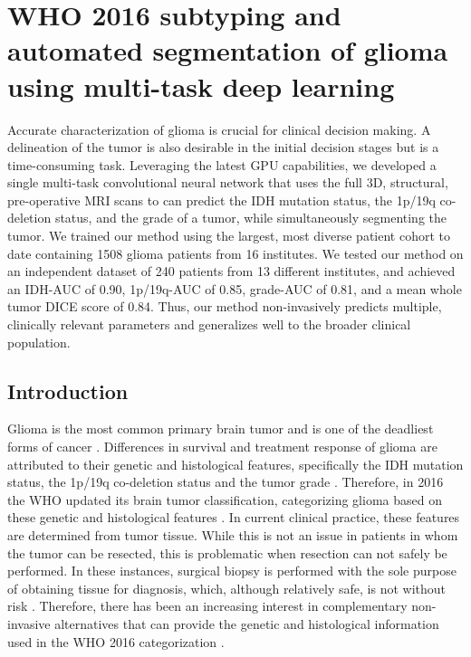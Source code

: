 \chapter[WHO 2016 subtyping and automated segmentation of glioma using multi-task deep learning][WHO 2016 subtyping]{WHO 2016 subtyping and automated segmentation of glioma using multi-task deep learning}\label{chap:prognosais}

\begin{ChapterAbstract}
    Accurate characterization of glioma is crucial for clinical decision making.
    A delineation of the tumor is also desirable in the initial decision stages but is a time-consuming task.
    Leveraging the latest GPU capabilities, we developed a single multi-task convolutional neural network that uses the full 3D, structural, pre-operative MRI scans to can predict the IDH mutation status, the 1p/19q co-deletion status, and the grade of a tumor, while simultaneously segmenting the tumor.
    We trained our method using the largest, most diverse patient cohort to date containing 1508 glioma patients from 16 institutes.
    We tested our method on an independent dataset of 240  patients from 13 different institutes, and achieved an IDH-AUC of 0.90, 1p/19q-AUC of 0.85, grade-AUC of 0.81, and a mean whole tumor DICE score of 0.84.
    Thus, our method non-invasively predicts multiple, clinically relevant parameters and generalizes well to the broader clinical population.
\end{ChapterAbstract}

\setcellgapes{5pt}

\section{Introduction}
Glioma is the most common primary brain tumor and is one of the deadliest forms of cancer \autocite{office2019cancer}.
Differences in survival and treatment response of glioma are attributed to their genetic and histological features, specifically the \gls{IDH} mutation status, the 1p/19q co-deletion status and the tumor grade \autocite{dubbink2015molecular, eckel2015gliomagroups}.
Therefore, in 2016 the \gls{WHO} updated its brain tumor classification, categorizing glioma based on these genetic and histological features \autocite{louis20162016}.
In current clinical practice, these features are determined from tumor tissue.
While this is not an issue in patients in whom the tumor can be resected, this is problematic when resection can not safely be performed.
In these instances,  surgical biopsy is performed with the sole purpose of obtaining tissue for diagnosis, which, although relatively safe, is not without risk \autocite{chen2009biopsy, jackson2001biopsylimitations}.
Therefore, there has been an increasing interest in complementary non-invasive alternatives that can provide the genetic and histological information used in the \gls{WHO} 2016 categorization \autocite{zhou2018radiomicsbrain, bi2019AIcancer}.

